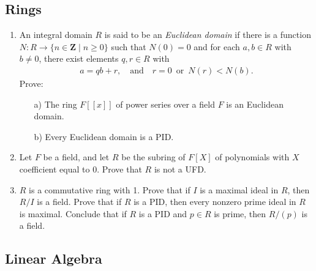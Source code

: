 \documentclass[11pt]{amsart}
\theoremstyle{plain}
\theoremstyle{definition}
\theoremstyle{remark}
\begin{document}
\subsection{Rings}

    \begin{enumerate}
        \item An integral domain $R$ is said to be an {\it Euclidean domain} if there is a function $N: R \to \{n\in\mathbf{Z} \mid n\geq 0\}$ such that $N(0)=0$ and for each $a,b\in R$ with $b\neq 0$, there exist elements $q,r\in R$ with
    \begin{align*}
        a = qb + r, \quad \text{and} \quad r = 0 \, \text{ or } \, N(r) < N(b).
    \end{align*}
    Prove:
    \begin{enumerate}
        \item[a)] The ring $F[[x]]$ of power series over a field $F$ is an Euclidean domain.
        
        \item[b)] Every Euclidean domain is a PID. 
    \end{enumerate}
    
    \item Let $F$ be a field, and let $R$ be the subring of $F[X]$ of polynomials with $X$ coefficient equal to $0$. Prove that $R$ is not a UFD.
    
    \item $R$ is a commutative ring with 1. Prove that if $I$ is a maximal ideal in $R$, then $R/I$ is a field. Prove that if $R$ is a PID, then every nonzero prime ideal in $R$ is maximal. Conclude that if $R$ is a PID and $p\in R$ is prime, then $R/(p)$ is a field.
    
    \end{enumerate}

\subsection{Linear Algebra}
\end{document}
